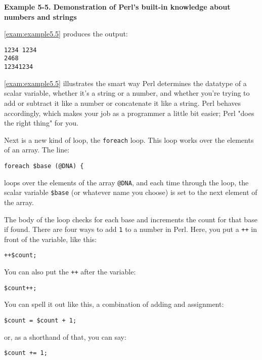 \textbf{Example 5-5. Demonstration of Perl's built-in knowledge about numbers and strings}


\autoref{exam:example5.5} produces the output:

\begin{lstlisting}
1234 1234
2468
12341234
\end{lstlisting}

\autoref{exam:example5.5} illustrates the smart way Perl determines the datatype of a scalar variable, whether it's a string or a number, and whether you're trying to add or subtract it like a number or concatenate it like a string. Perl behaves accordingly, which makes your job as a programmer a little bit easier; Perl "does the right thing" for you.

Next is a new kind of loop, the \verb|foreach| loop. This loop works over the elements of an array. The line: 

\begin{lstlisting}
foreach $base (@DNA) {
\end{lstlisting}

loops over the elements of the array \verb|@DNA|, and each time through the loop, the scalar variable \verb|$base| (or whatever name you choose) is set to the next element of the array.

The body of the loop checks for each base and increments the count for
that base if found. There are four ways to add \verb|1| to a number in Perl.
Here, you put a \verb|++| in front of the variable, like this:

\begin{lstlisting}
++$count; 
\end{lstlisting}

You can also put the \verb|++| after the variable:

\begin{lstlisting}
$count++;
\end{lstlisting}

You can spell it out like this, a combination of adding and assignment:

\begin{lstlisting}
$count = $count + 1;
\end{lstlisting}

or, as a shorthand of that, you can say:

\begin{lstlisting}
$count += 1;
\end{lstlisting}

